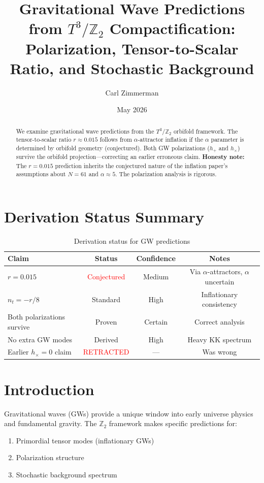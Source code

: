 \documentclass[12pt,a4paper]{article}
\title{Gravitational Wave Predictions from $T^3/\mathbb{Z}_2$ Compactification:\\
Polarization, Tensor-to-Scalar Ratio, and Stochastic Background}
\author{Carl Zimmerman}
\date{May 2026}
\begin{document}
\maketitle

\begin{abstract}
We examine gravitational wave predictions from the $T^3/\mathbb{Z}_2$ orbifold framework. The tensor-to-scalar ratio $r \approx 0.015$ follows from $\alpha$-attractor inflation if the $\alpha$ parameter is determined by orbifold geometry (conjectured). Both GW polarizations ($h_+$ and $h_\times$) survive the orbifold projection---correcting an earlier erroneous claim. \textbf{Honesty note:} The $r = 0.015$ prediction inherits the conjectured nature of the inflation paper's assumptions about $N = 61$ and $\alpha \approx 5$. The polarization analysis is rigorous.
\end{abstract}

\section{Derivation Status Summary}

\begin{table}[h]
\centering
\begin{tabular}{lccc}
\toprule
Claim & Status & Confidence & Notes \\
\midrule
$r = 0.015$ & \textcolor{red}{Conjectured} & Medium & Via $\alpha$-attractors, $\alpha$ uncertain \\
$n_t = -r/8$ & \textcolor{green!50!black}{Standard} & High & Inflationary consistency \\
Both polarizations survive & \textcolor{green!50!black}{Proven} & Certain & Correct analysis \\
No extra GW modes & \textcolor{green!50!black}{Derived} & High & Heavy KK spectrum \\
Earlier $h_\times = 0$ claim & \textcolor{red}{RETRACTED} & --- & Was wrong \\
\bottomrule
\end{tabular}
\caption{Derivation status for GW predictions}
\end{table}

\section{Introduction}

Gravitational waves (GWs) provide a unique window into early universe physics and fundamental gravity. The $\mathbb{Z}_2$ framework makes specific predictions for:
\begin{enumerate}
    \item Primordial tensor modes (inflationary GWs)
    \item Polarization structure
    \item Stochastic background spectrum
\end{enumerate}
\end{document}
